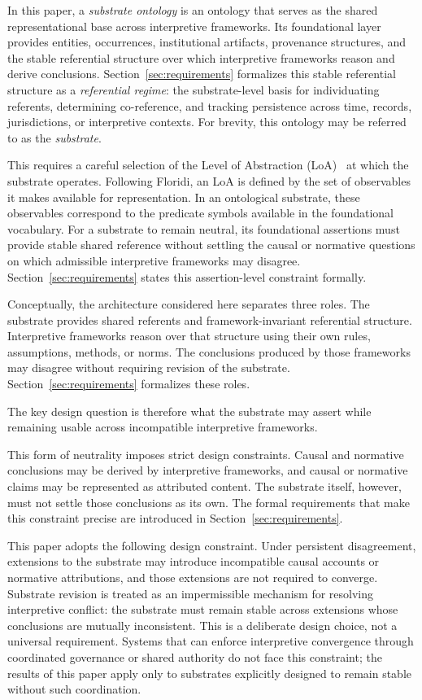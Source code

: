 In this paper, a \emph{substrate ontology} is an ontology that serves
as the shared representational base across interpretive frameworks.
Its foundational layer provides entities, occurrences,
institutional artifacts, provenance structures, and the stable
referential structure over which interpretive frameworks reason
and derive conclusions.
Section~\ref{sec:requirements} formalizes this stable referential
structure as a \emph{referential regime}: the substrate-level basis
for individuating referents, determining co-reference, and tracking
persistence across time, records, jurisdictions, or interpretive contexts.
For brevity, this ontology may be referred to as the \emph{substrate}.

This requires a careful selection of the
Level of Abstraction (LoA)~\citep{floridi2008levels}
at which the substrate operates.
Following Floridi, an LoA is defined by the set of
observables it makes available for representation.
In an ontological substrate, these observables correspond
to the predicate symbols available in the foundational vocabulary.
For a substrate to remain neutral,
its foundational assertions must provide stable shared reference
without settling the causal or normative questions
on which admissible interpretive frameworks may disagree.
Section~\ref{sec:requirements} states this assertion-level constraint
formally.

Conceptually, the architecture considered here separates three roles.
The substrate provides shared referents and framework-invariant
referential structure.
Interpretive frameworks reason over that structure using their own
rules, assumptions, methods, or norms.
The conclusions produced by those frameworks may disagree without
requiring revision of the substrate.
Section~\ref{sec:requirements} formalizes these roles.

The key design question is therefore what the substrate may assert
while remaining usable across incompatible interpretive frameworks.

This form of neutrality imposes strict design constraints.
Causal and normative conclusions may be derived by interpretive
frameworks, and causal or normative claims may be represented
as attributed content.
The substrate itself, however, must not settle those conclusions
as its own.
The formal requirements that make this constraint precise
are introduced in Section~\ref{sec:requirements}.

This paper adopts the following design constraint.
Under persistent disagreement, extensions to the substrate may
introduce incompatible causal accounts or normative attributions,
and those extensions are not required to converge.
Substrate revision is treated as an impermissible
mechanism for resolving interpretive conflict: the substrate
must remain stable across extensions whose conclusions are
mutually inconsistent.
This is a deliberate design choice, not a universal requirement.
Systems that can enforce interpretive convergence through
coordinated governance or shared authority do not face this
constraint; the results of this paper apply only to substrates
explicitly designed to remain stable without such coordination.

